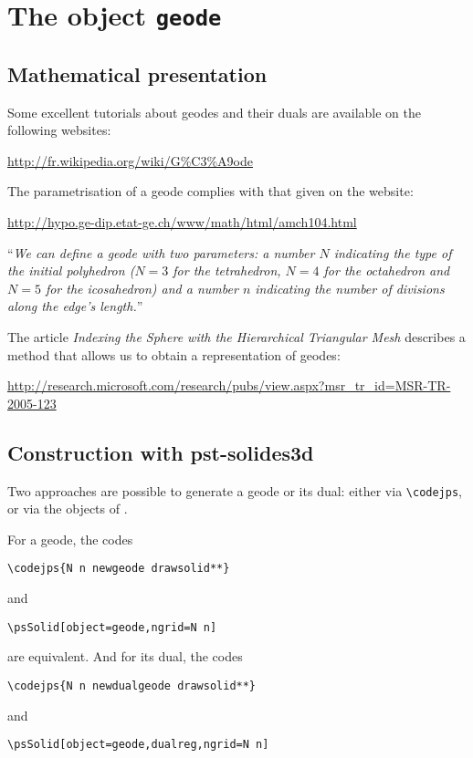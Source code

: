 \section{The object \texttt{geode}}

\subsection{Mathematical presentation}

Some excellent tutorials about geodes and their duals are available on the following websites:

\centerline{\url{http://fr.wikipedia.org/wiki/G\%C3\%A9ode}}

The parametrisation of a geode complies with that given on the website:


\centerline{\url{http://hypo.ge-dip.etat-ge.ch/www/math/html/amch104.html}}

``\textit{We can define a geode with two parameters: a number $N$ indicating the type of the initial polyhedron  ($N = 3$ for the tetrahedron, $N = 4$ for the octahedron and $N = 5$ for the icosahedron) and a number $n$ indicating the number of divisions along the edge's length.}''


The article \textit{Indexing the Sphere with the Hierarchical Triangular Mesh} describes a method that allows us to obtain a representation of geodes:


\centerline{\url{http://research.microsoft.com/research/pubs/view.aspx?msr_tr_id=MSR-TR-2005-123}}

\subsection{Construction with pst-solides3d}

Two approaches are possible to generate a geode or its dual:
either via \verb+\codejps+, or via the objects of
.

For a geode, the codes
\begin{verbatim}
\codejps{N n newgeode drawsolid**}
\end{verbatim}
and
\begin{verbatim}
\psSolid[object=geode,ngrid=N n]
\end{verbatim}
are equivalent. And for its dual, the codes
\begin{verbatim}
\codejps{N n newdualgeode drawsolid**}
\end{verbatim}
and
\begin{verbatim}
\psSolid[object=geode,dualreg,ngrid=N n]
\end{verbatim}



